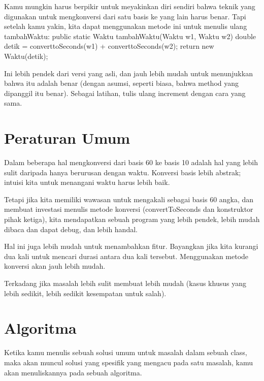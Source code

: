 Kamu mungkin harus berpikir untuk meyakinkan diri sendiri bahwa teknik yang digunakan untuk mengkonversi dari satu basis ke yang lain harus benar. Tapi setelah kamu yakin, kita dapat menggunakan metode ini untuk menulis ulang tambahWaktu:
\newline
public static Waktu tambahWaktu(Waktu w1, Waktu w2)\textbraceleft \newline
	double detik = converttoSeconds(w1) + converttoSeconds(w2); \newline
	return new Waktu(detik); \newline
\textbraceright \newline

Ini lebih pendek dari versi yang asli, dan jauh lebih mudah untuk menunjukkan bahwa itu adalah benar (dengan asumsi, seperti biasa, bahwa method yang dipanggil itu benar). Sebagai latihan, tulis ulang increment dengan cara yang sama.

\section{Peraturan Umum}

Dalam beberapa hal mengkonversi dari basis 60 ke basis 10 adalah hal yang lebih sulit daripada hanya berurusan dengan waktu. Konversi basis lebih abstrak; intuisi kita untuk menangani waktu harus lebih baik.

Tetapi jika kita memiliki wawasan untuk mengakali sebagai basis 60 angka, dan membuat investasi menulis metode konversi (convertToSeconds dan konstruktor pihak ketiga), kita mendapatkan sebuah program yang lebih pendek, lebih mudah dibaca dan dapat debug, dan lebih handal.

Hal ini juga lebih mudah untuk menambahkan fitur. Bayangkan jika kita kurangi dua kali untuk mencari durasi antara dua kali tersebut. Menggunakan metode konversi akan jauh lebih mudah.

Terkadang jika masalah lebih sulit membuat lebih mudah (kasus khusus yang lebih sedikit, lebih sedikit kesempatan untuk salah).

\section{Algoritma}

Ketika kamu menulis sebuah solusi umum untuk masalah dalam sebuah class, maka akan muncul solusi yang spesifik yang mengacu pada satu masalah, kamu akan menuliskannya pada sebuah algoritma. 

